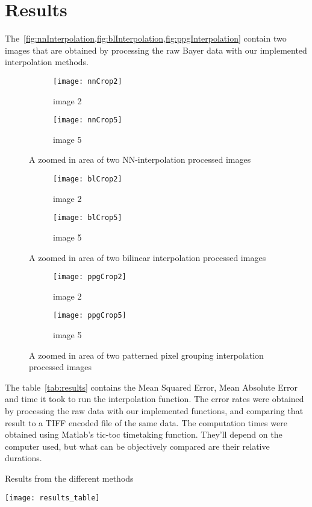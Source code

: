 \section{Results}

The~\cref{fig:nnInterpolation,fig:blInterpolation,fig:ppgInterpolation}
contain two images that are obtained by processing the raw Bayer data with our
implemented interpolation methods.

\begin{figure}[H]
\centering
\begin{subfigure}{.25\textwidth}
  \centering
  \texttt{[image: nnCrop2]}
  \caption{image 2}
\label{fig:nnCrop2}
\end{subfigure}%
\begin{subfigure}{.25\textwidth}
  \centering
  \texttt{[image: nnCrop5]}
  \caption{image 5}
\label{fig:nnCrop5}
\end{subfigure}
\caption{A zoomed in area of two NN-interpolation processed images}
\label{fig:nnInterpolation}
\end{figure}


\begin{figure}[H]
\centering
\begin{subfigure}{.25\textwidth}
  \centering
  \texttt{[image: blCrop2]}
  \caption{image 2}
\label{fig:blCrop2}
\end{subfigure}%
\begin{subfigure}{.25\textwidth}
  \centering
  \texttt{[image: blCrop5]}
  \caption{image 5}
\label{fig:blCrop5}
\end{subfigure}
\caption{A zoomed in area of two bilinear interpolation processed images}
\label{fig:blInterpolation}
\end{figure}


\begin{figure}[H]
\centering
\begin{subfigure}{.25\textwidth}
  \centering
  \texttt{[image: ppgCrop2]}
  \caption{image 2}
\label{fig:ppgCrop2}
\end{subfigure}%
\begin{subfigure}{.25\textwidth}
  \centering
  \texttt{[image: ppgCrop5]}
  \caption{image 5}
\label{fig:ppgCrop5}
\end{subfigure}
\caption{A zoomed in area of two patterned pixel grouping interpolation processed images}
\label{fig:ppgInterpolation}
\end{figure}


The table~\ref{tab:results} contains the Mean Squared Error, Mean Absolute
Error and time it took to run the interpolation function. The error rates were
obtained by processing the raw data with our implemented functions, and
comparing that result to a TIFF encoded file of the same data. The computation
times were obtained using Matlab's tic-toc timetaking function. They'll
depend on the computer used, but what can be objectively compared are their
relative durations.
\begin{table}[H]
  \centering
  \caption{Results from the different methods}
\label{tab:results}
  \texttt{[image: results\_table]}
\end{table}


